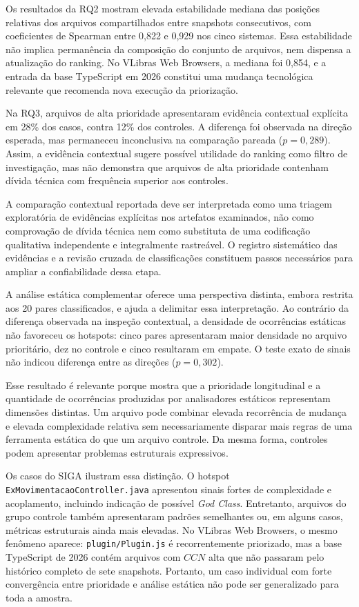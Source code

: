 \documentclass[12pt]{article}
\newcommand{\CCN}{\ensuremath{CCN}}
\begin{document}
Os resultados da RQ2 mostram elevada estabilidade mediana das posições relativas dos arquivos compartilhados entre snapshots consecutivos, com coeficientes de Spearman entre 0,822 e 0,929 nos cinco sistemas. Essa estabilidade não implica permanência da composição do conjunto de arquivos, nem dispensa a atualização do ranking. No VLibras Web Browsers, a mediana foi 0,854, e a entrada da base TypeScript em 2026 constitui uma mudança tecnológica relevante que recomenda nova execução da priorização.

Na RQ3, arquivos de alta prioridade apresentaram evidência contextual explícita em 28\% dos casos, contra 12\% dos controles. A diferença foi observada na direção esperada, mas permaneceu inconclusiva na comparação pareada ($p=0{,}289$). Assim, a evidência contextual sugere possível utilidade do ranking como filtro de investigação, mas não demonstra que arquivos de alta prioridade contenham dívida técnica com frequência superior aos controles.

A comparação contextual reportada deve ser interpretada como uma triagem exploratória de evidências explícitas nos artefatos examinados, não como comprovação de dívida técnica nem como substituta de uma codificação qualitativa independente e integralmente rastreável. O registro sistemático das evidências e a revisão cruzada de classificações constituem passos necessários para ampliar a confiabilidade dessa etapa.

A análise estática complementar oferece uma perspectiva distinta, embora restrita aos 20 pares classificados, e ajuda a delimitar essa interpretação. Ao contrário da diferença observada na inspeção contextual, a densidade de ocorrências estáticas não favoreceu os hotspots: cinco pares apresentaram maior densidade no arquivo prioritário, dez no controle e cinco resultaram em empate. O teste exato de sinais não indicou diferença entre as direções ($p=0{,}302$).

Esse resultado é relevante porque mostra que a prioridade longitudinal e a quantidade de ocorrências produzidas por analisadores estáticos representam dimensões distintas. Um arquivo pode combinar elevada recorrência de mudança e elevada complexidade relativa sem necessariamente disparar mais regras de uma ferramenta estática do que um arquivo controle. Da mesma forma, controles podem apresentar problemas estruturais expressivos.

Os casos do SIGA ilustram essa distinção. O hotspot \texttt{ExMovimentacaoController.java} apresentou sinais fortes de complexidade e acoplamento, incluindo indicação de possível \emph{God Class}. Entretanto, arquivos do grupo controle também apresentaram padrões semelhantes ou, em alguns casos, métricas estruturais ainda mais elevadas. No VLibras Web Browsers, o mesmo fenômeno aparece: \texttt{plugin/Plugin.js} é recorrentemente priorizado, mas a base TypeScript de 2026 contém arquivos com \CCN{} alta que não passaram pelo histórico completo de sete snapshots. Portanto, um caso individual com forte convergência entre prioridade e análise estática não pode ser generalizado para toda a amostra.
\end{document}
